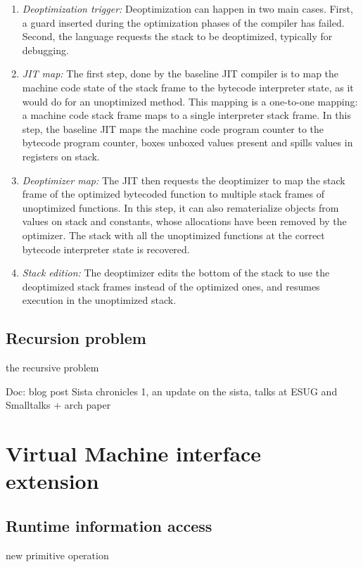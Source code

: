 \documentclass[a4paper,12pt,twoside]{../includes/ThesisStyle}
\begin{document}
\begin{enumerate}
\item \emph{Deoptimization trigger:} Deoptimization can happen in two main cases. First, a guard inserted during the optimization phases of the compiler has failed. Second, the language requests the stack to be deoptimized, typically for debugging.
\item \emph{JIT map:} The first step, done by the baseline JIT compiler is to map the machine code state of the stack frame to the bytecode interpreter state, as it would do for an unoptimized method. This mapping is a one-to-one mapping: a machine code stack frame maps to a single interpreter stack frame. In this step, the baseline JIT maps the machine code program counter to the bytecode program counter, boxes unboxed values present and spills values in registers on stack.
\item \emph{Deoptimizer map:} The JIT then requests the deoptimizer to map the stack frame of the optimized bytecoded function to multiple stack frames of unoptimized functions. In this step, it can also rematerialize objects from values on stack and constants, whose allocations have been removed by the optimizer. The stack with all the unoptimized functions at the correct bytecode interpreter state is recovered.
\item \emph{Stack edition:}
The deoptimizer edits the bottom of the stack to use the deoptimized stack frames instead of the optimized ones, and resumes execution in the unoptimized stack.
\end{enumerate}

\subsection{Recursion problem}

the recursive problem

Doc: blog post Sista chronicles 1, an update on the sista, talks at ESUG and Smalltalks + arch paper

\section{Virtual Machine interface extension}

\subsection{Runtime information access}

new primitive operation
\end{document}
